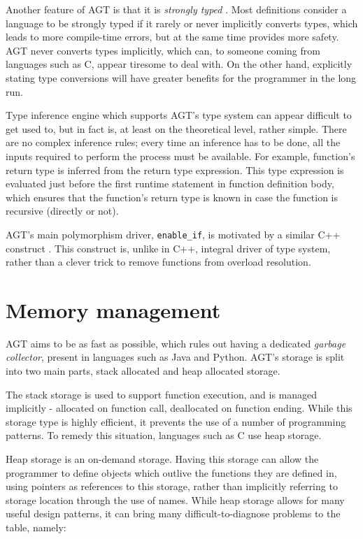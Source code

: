 \documentclass[times, utf8, diplomski]{fer}
\theoremstyle{definition}
\begin{document}
Another feature of AGT is that it is \textit{strongly typed} \citep{c_strong_typing}. 
Most definitions consider
a language to be strongly typed if it rarely or never implicitly converts
types, which leads to more compile-time errors, but at the same time provides
more safety. AGT never converts types implicitly,
which can, to someone coming from languages such as C, appear tiresome to deal with. On the other hand,
explicitly stating type conversions will have greater benefits for the
programmer in the long run.

Type inference engine which supports AGT's type system can appear difficult to
get used to, but in fact is, at least on the theoretical level, rather simple.
There are no complex inference rules;
every time an inference has to be done, all the inputs required to perform the process must be available.
For example, function's return type is inferred from the return type expression. 
This type expression is evaluated
just before the first runtime statement in function definition body, which
ensures that the function's return type is known in case the function is
recursive (directly or not).

AGT's main polymorphism driver, \texttt{enable\_if}, is motivated by a similar C++ construct
\citep{c_enable_if}. This construct is, unlike in C++, integral driver of type system,
rather than a clever trick to remove functions from overload resolution.

\section{Memory management}

AGT aims to be as fast as possible, which rules out having a dedicated \textit{garbage collector},
present in languages such as Java and Python. AGT's storage is split into two main parts,
stack allocated and heap allocated storage. 

The stack storage is used to support function
execution, and is managed implicitly - allocated on function call, deallocated on function ending.
While this storage type is highly efficient, it prevents the use of a number of programming patterns.
To remedy this situation, languages such as C use heap storage. 

Heap storage is an on-demand storage. Having this storage can allow the programmer to define
objects which outlive the functions they are defined in, using pointers as references to this storage,
rather than implicitly referring to storage location through the use of names.
While heap storage allows for many useful design patterns, it can bring many difficult-to-diagnose
problems to the table, namely:
\end{document}
